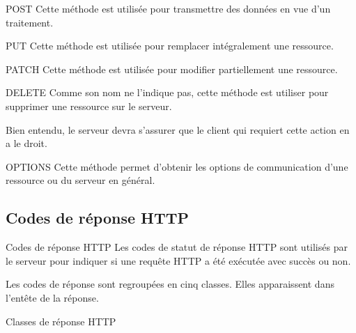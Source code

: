\documentclass{beamer}
\begin{document}
\begin{frame}{POST}
Cette méthode est utilisée pour transmettre des données en vue d'un traitement.
\end{frame}

\begin{frame}{PUT}
Cette méthode est utilisée pour remplacer intégralement une ressource.
\end{frame}

\begin{frame}{PATCH}
Cette méthode est utilisée pour modifier partiellement une ressource.
\end{frame}

\begin{frame}{DELETE}
Comme son nom ne l'indique pas, cette méthode est utiliser pour supprimer une ressource sur le serveur.

Bien entendu, le serveur devra s'assurer que le client qui requiert cette action en a le droit.
\end{frame}

\begin{frame}{OPTIONS}
Cette méthode permet d'obtenir les options de communication d'une ressource ou du serveur en général.
\end{frame}

\subsection{Codes de réponse HTTP}
\begin{frame}{Codes de réponse HTTP}
  Les codes de statut de réponse HTTP sont utilisés par le serveur pour indiquer si une requête HTTP a été exécutée avec succès ou non.

  Les codes de réponse sont regroupées en cinq classes. Elles apparaissent dans l'entête de la réponse.
\end{frame}

\begin{frame}{Classes de réponse HTTP}
\begin{itemize}
\end{itemize}
\end{frame}
\end{document}
